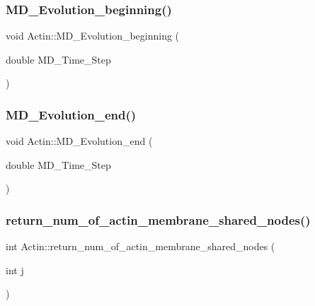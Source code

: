 \mbox{\label{classActin_ac8721458347af82c26f5c77351495116}} 
\subsubsection{\texorpdfstring{MD\_Evolution\_beginning()}{MD\_Evolution\_beginning()}}
{\footnotesize\ttfamily void Actin\+::\+M\+D\+\_\+\+Evolution\+\_\+beginning (\begin{DoxyParamCaption}\item[{double}]{M\+D\+\_\+\+Time\+\_\+\+Step }\end{DoxyParamCaption})}

\mbox{\label{classActin_a2311cdc6c25be425fcd52863d628bf78}} 
\subsubsection{\texorpdfstring{MD\_Evolution\_end()}{MD\_Evolution\_end()}}
{\footnotesize\ttfamily void Actin\+::\+M\+D\+\_\+\+Evolution\+\_\+end (\begin{DoxyParamCaption}\item[{double}]{M\+D\+\_\+\+Time\+\_\+\+Step }\end{DoxyParamCaption})}

\mbox{\label{classActin_ad6b6cfbc32c772aa024eafa5caea16ab}} 
\subsubsection{\texorpdfstring{return\_num\_of\_actin\_membrane\_shared\_nodes()}{return\_num\_of\_actin\_membrane\_shared\_nodes()}}
{\footnotesize\ttfamily int Actin\+::return\+\_\+num\+\_\+of\+\_\+actin\+\_\+membrane\+\_\+shared\+\_\+nodes (\begin{DoxyParamCaption}\item[{int}]{j }\end{DoxyParamCaption})\hspace{0.3cm}{\ttfamily [inline]}}

